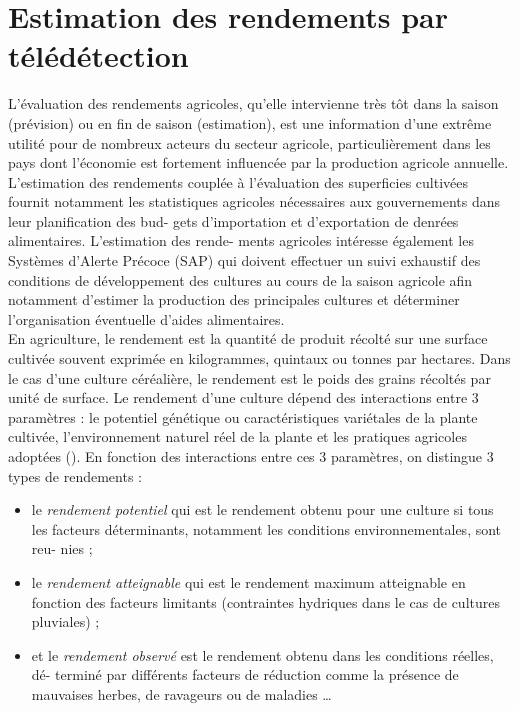 \section{Estimation des rendements par télédétection}

L’évaluation des rendements agricoles, qu’elle intervienne très tôt dans la saison
(prévision) ou en fin de saison (estimation), est une information d’une extrême utilité
pour de nombreux acteurs du secteur agricole, particulièrement dans les pays dont
l’économie est fortement influencée par la production agricole annuelle. L’estimation
des rendements couplée à l’évaluation des superficies cultivées fournit notamment les
statistiques agricoles nécessaires aux gouvernements dans leur planification des bud-
gets d’importation et d’exportation de denrées alimentaires. L’estimation des rende-
ments agricoles intéresse également les Systèmes d’Alerte Précoce (SAP) qui doivent
effectuer un suivi exhaustif des conditions de développement des cultures au cours
de la saison agricole afin notamment d’estimer la production des principales cultures
et déterminer l’organisation éventuelle d’aides alimentaires.
\\En agriculture, le rendement est la quantité de produit récolté sur une surface cultivée souvent exprimée en kilogrammes, quintaux ou tonnes par hectares. Dans le cas d’une culture céréalière, le rendement est le poids des grains récoltés par unité de surface.
Le rendement d’une culture dépend des interactions entre 3 paramètres : le potentiel
génétique ou caractéristiques variétales de la plante cultivée, l’environnement naturel
réel de la plante et les pratiques agricoles adoptées (). En fonction des interactions entre ces 3 paramètres, on distingue 3 types de rendements \citep{Neumann2010,Tittonell2013,VanIttersum2013} :
\begin{itemize}
 \item le \emph{rendement potentiel} qui est le rendement obtenu pour une culture si tous les
facteurs déterminants, notamment les conditions environnementales, sont reu-
nies ; 
\item le \emph{rendement atteignable} qui est le rendement maximum atteignable en fonction
des facteurs limitants (contraintes hydriques dans le cas de cultures pluviales) ;
\item et le \emph{rendement observé} est le rendement obtenu dans les conditions réelles, dé-
terminé par différents facteurs de réduction comme la présence de mauvaises
herbes, de ravageurs ou de maladies \ldots
\end{itemize}

